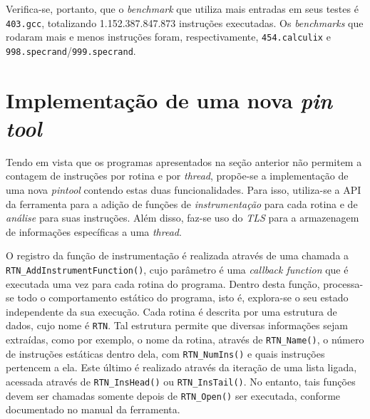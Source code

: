 \documentclass[12pt]{article}
\begin{document}
Verifica-se, portanto, que o \textit{benchmark} que utiliza mais entradas em
seus testes é \texttt{403.gcc}, totalizando 1.152.387.847.873 instruções
executadas. Os \textit{benchmarks} que rodaram mais e menos instruções foram,
respectivamente, \texttt{454.calculix} e
\texttt{998.specrand}/\texttt{999.specrand}.


\section{Implementação de uma nova \textit{pin tool}} \label{sec:tool}

Tendo em vista que os programas apresentados na seção anterior não permitem a
contagem de instruções por rotina e por \textit{thread}, propõe-se a
implementação de uma nova \textit{pintool} contendo estas duas funcionalidades.
Para isso, utiliza-se a API da ferramenta para a adição de funções de
\textit{instrumentação} para cada rotina e de \textit{análise} para suas
instruções. Além disso, faz-se uso do \textit{TLS} para a armazenagem de
informações específicas a uma \textit{thread}.

O registro da função de instrumentação é realizada através de uma chamada a
\texttt{RTN\_AddInstrumentFunction()}, cujo  parâmetro é uma
\textit{callback function} que é executada uma vez para cada rotina do
programa. Dentro desta função, processa-se todo o comportamento estático do
programa, isto é, explora-se o seu estado independente da sua execução. Cada
rotina é descrita por uma estrutura de dados, cujo nome é \texttt{RTN}. Tal
estrutura permite que diversas informações sejam extraídas, como por exemplo, o
nome da rotina, através de \texttt{RTN\_Name()}, o número de instruções
estáticas dentro dela, com \texttt{RTN\_NumIns()} e quais instruções pertencem a
ela. Este último é realizado através da iteração de uma lista ligada, acessada
através de \texttt{RTN\_InsHead()} ou \texttt{RTN\_InsTail()}. No entanto, tais
funções devem ser chamadas somente depois de \texttt{RTN\_Open()} ser executada,
conforme documentado no manual da ferramenta.
\end{document}
